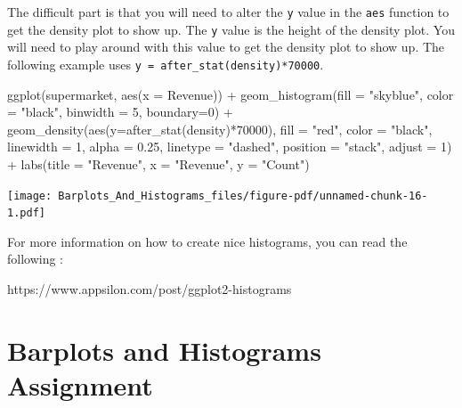 \documentclass[
  letterpaper,
  DIV=11,
  numbers=noendperiod]{scrreprt}
\newenvironment{Shaded}{\begin{snugshade}}{\end{snugshade}}
\newcommand{\AttributeTok}[1]{\textcolor[rgb]{0.40,0.45,0.13}{#1}}
\newcommand{\DecValTok}[1]{\textcolor[rgb]{0.68,0.00,0.00}{#1}}
\newcommand{\FloatTok}[1]{\textcolor[rgb]{0.68,0.00,0.00}{#1}}
\newcommand{\FunctionTok}[1]{\textcolor[rgb]{0.28,0.35,0.67}{#1}}
\newcommand{\NormalTok}[1]{\textcolor[rgb]{0.00,0.23,0.31}{#1}}
\newcommand{\SpecialCharTok}[1]{\textcolor[rgb]{0.37,0.37,0.37}{#1}}
\newcommand{\StringTok}[1]{\textcolor[rgb]{0.13,0.47,0.30}{#1}}
\begin{document}
The difficult part is that you will need to alter the \texttt{y} value
in the \texttt{aes} function to get the density plot to show up. The
\texttt{y} value is the height of the density plot. You will need to
play around with this value to get the density plot to show up. The
following example uses \texttt{y\ =\ after\_stat(density)*70000}.

\begin{Shaded}
\begin{Highlighting}[]
\FunctionTok{ggplot}\NormalTok{(supermarket, }\FunctionTok{aes}\NormalTok{(}\AttributeTok{x =} \StringTok{\textasciigrave{}}\AttributeTok{Revenue}\StringTok{\textasciigrave{}}\NormalTok{)) }\SpecialCharTok{+}
  \FunctionTok{geom\_histogram}\NormalTok{(}\AttributeTok{fill =} \StringTok{"skyblue"}\NormalTok{, }\AttributeTok{color =} \StringTok{"black"}\NormalTok{, }\AttributeTok{binwidth =} \DecValTok{5}\NormalTok{, }\AttributeTok{boundary=}\DecValTok{0}\NormalTok{) }\SpecialCharTok{+}
  \FunctionTok{geom\_density}\NormalTok{(}\FunctionTok{aes}\NormalTok{(}\AttributeTok{y=}\FunctionTok{after\_stat}\NormalTok{(density)}\SpecialCharTok{*}\DecValTok{70000}\NormalTok{), }\AttributeTok{fill =} \StringTok{"red"}\NormalTok{, }\AttributeTok{color =} \StringTok{"black"}\NormalTok{, }
               \AttributeTok{linewidth =} \DecValTok{1}\NormalTok{, }\AttributeTok{alpha =} \FloatTok{0.25}\NormalTok{, }\AttributeTok{linetype =} \StringTok{"dashed"}\NormalTok{, }
               \AttributeTok{position =} \StringTok{"stack"}\NormalTok{, }\AttributeTok{adjust =} \DecValTok{1}\NormalTok{) }\SpecialCharTok{+}
  \FunctionTok{labs}\NormalTok{(}\AttributeTok{title =} \StringTok{"Revenue"}\NormalTok{,}
       \AttributeTok{x =} \StringTok{"Revenue"}\NormalTok{,}
       \AttributeTok{y =} \StringTok{"Count"}\NormalTok{)}
\end{Highlighting}
\end{Shaded}

\texttt{[image: Barplots\_And\_Histograms\_files/figure-pdf/unnamed-chunk-16-1.pdf]}

For more information on how to create nice histograms, you can read the
following :

https://www.appsilon.com/post/ggplot2-histograms


\chapter*{Barplots and Histograms
Assignment}\label{barplots-and-histograms-assignment}
\end{document}
